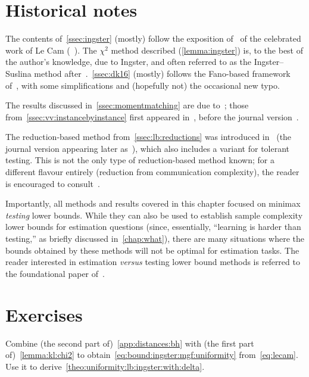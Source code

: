 \section{Historical notes}

The contents of~\cref{ssec:ingster} (mostly) follow the exposition of~\citet{Pollard:2003} of the celebrated work of Le Cam (\eg~\citet{LeCam73}). The $\chi^2$ method described (\cref{lemma:ingster}) is, to the best of the author's knowledge, due to Ingster, and often referred to as the Ingster--Suslina method after~\citep{IngsterS03}.~\cref{ssec:dk16} (mostly) follows the Fano-based framework of~\citet{DiakonikolasK16}, with some simplifications and (hopefully not) the occasional new typo.

The results discussed in~\cref{ssec:momentmatching} are due to~\citet{Valiant:11}; those from~\cref{ssec:vv:instancebyinstance} first appeared in~\citet{VV:14:FOCS}, before the journal version~\citep{ValiantV17}.

The reduction-based method from~\cref{ssec:lb:reductions} was introduced in~\citet{CDGR:16} (the journal version appearing later as~\citep{CDGR:17:journal}), which also includes a variant for tolerant testing. This is not the only type of reduction-based method known; for a different flavour entirely (reduction from communication complexity), the reader is encouraged to consult~\citet{BlaisCG19}.

Importantly, all methods and results covered in this chapter focused on minimax \emph{testing} lower bounds. While they can also be used to establish sample complexity lower bounds for estimation questions (since, essentially, ``learning is harder than testing,'' as briefly discussed in~\cref{chap:what}), there are many situations where the bounds obtained by these methods will not be optimal for estimation tasks. The reader interested in estimation \textit{versus} testing lower bound methods is referred to the foundational paper of~\citet{Yu97}.

\section{Exercises}

\begin{question}\label{exo:deriving:dep:delta:lb}
Combine (the second part of)~\cref{app:distances:bh} with (the first part of)~\cref{lemma:kl:chi2} to obtain~\cref{eq:bound:ingster:mgf:uniformity} from~\cref{eq:lecam}. Use it to derive~\cref{theo:uniformity:lb:ingster:with:delta}.
\end{question}

